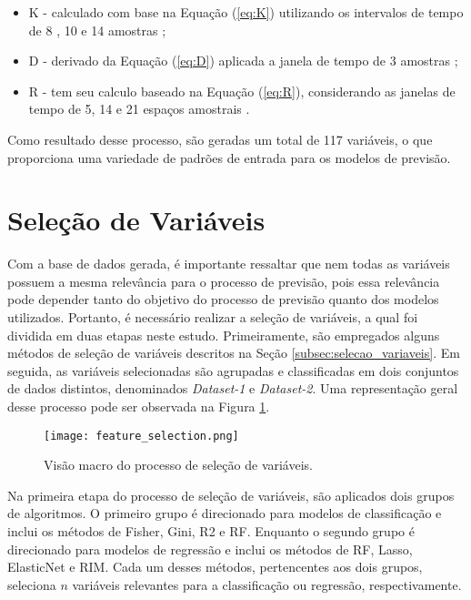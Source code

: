 \begin{itemize}
    \item \ac{K} - calculado com base na Equação (\ref{eq:K}) utilizando os intervalos de tempo de 8 \cite{ni2022does}, 10 \cite{ijegwa2014predictive} e 14 amostras \cite{C_Veeramani_Exploration};
    
    \item \ac{D} - derivado da Equação (\ref{eq:D}) aplicada a janela de tempo de 3 amostras \cite{ijegwa2014predictive, vaidya2018stochastic};
    
    \item \ac{R} - tem seu calculo baseado na Equação (\ref{eq:R}), considerando as janelas de tempo de 5, 14 e 21 espaços amostrais \cite{de2016multi}.
\end{itemize}

Como resultado desse processo, são geradas um total de 117 variáveis, o que proporciona uma variedade de padrões de entrada para os modelos de previsão.



\section{Seleção de Variáveis}
\label{sec:selecao_variaveis}
Com a base de dados gerada, é importante ressaltar que nem todas as variáveis possuem a mesma relevância para o processo de previsão, pois essa relevância pode depender tanto do objetivo do processo de previsão quanto dos modelos utilizados. Portanto, é necessário realizar a seleção de variáveis, a qual foi dividida em duas etapas neste estudo. Primeiramente, são empregados alguns métodos de seleção de variáveis descritos na Seção \ref{subsec:selecao_variaveis}. Em seguida, as variáveis selecionadas são agrupadas e classificadas em dois conjuntos de dados distintos, denominados \textit{Dataset-1} e \textit{Dataset-2}. Uma representação geral desse processo pode ser observada na Figura \ref{fig:feature_selection}.

\begin{figure}[htbp]
    \caption{Visão macro do processo de seleção de variáveis.}
      \centering
    \texttt{[image: feature\_selection.png]} 
    \label{fig:feature_selection}
\end{figure}

Na primeira etapa do processo de seleção de variáveis, são aplicados dois grupos de algoritmos. O primeiro grupo é direcionado para modelos de classificação e inclui os métodos de Fisher, Gini, \ac{R2} e \ac{RF}. Enquanto o segundo grupo é direcionado para modelos de regressão e inclui os métodos de \ac{RF}, Lasso, ElasticNet e \ac{RIM}. Cada um desses métodos, pertencentes aos dois grupos, seleciona $n$ variáveis relevantes para a classificação ou regressão, respectivamente. 

